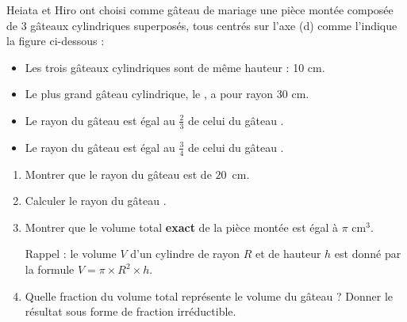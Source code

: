 \medskip

Heiata et Hiro ont choisi comme gâteau de mariage une pièce montée composée de 3 gâteaux cylindriques superposés, tous centrés sur l'axe (d) comme l'indique la figure ci-dessous :

\medskip
 
\parbox{0.4\linewidth}{

}\hfill
\parbox{0.55\linewidth}{
\begin{itemize}
\item[$\bullet~~$] Les trois gâteaux cylindriques sont de même hauteur : 10 cm. 
\item[$\bullet~~$] Le plus grand gâteau cylindrique, le , a pour rayon 30 cm. 
\item[$\bullet~~$] Le rayon du gâteau  est égal au $\frac{2}{3}$ de  
celui du gâteau . 
\item[$\bullet~~$] Le rayon du gâteau  est égal au $\frac{3}{4}$ de  celui du gâteau .
\end{itemize}}

\medskip 
	 	 
\begin{enumerate}
\item Montrer que le rayon du gâteau  est de $20$~cm. 
\item Calculer le rayon du gâteau . 
\item Montrer que le volume total \textbf{exact} de la pièce montée est égal à $\pi$ cm$^3$.
 
Rappel :  le volume $V$ d'un cylindre de rayon $R$ et de hauteur $h$ est donné par la formule  $V = \pi \times R^2 \times h$. 
\item Quelle fraction du volume total représente le volume du gâteau  ? Donner le résultat sous forme de fraction irréductible. 
\end{enumerate}

\bigskip
